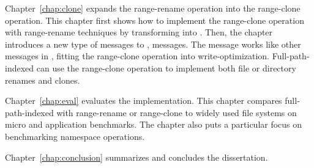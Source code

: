 Chapter~\ref{chap:clone} expands the range-rename operation into the
range-clone operation.
This chapter first shows how to implement the range-clone operation with
range-rename techniques by transforming \bets into \bedags.
Then, the chapter introduces a new type of messages to \bedags, \goto messages.
The \goto message works like other messages in \bedags,
fitting the range-clone operation into write-optimization.
Full-path-indexed \betrfs can use the range-clone operation to implement both
file or directory renames and clones.

Chapter~\ref{chap:eval} evaluates the implementation.
This chapter compares full-path-indexed \betrfs with range-rename or range-clone
to widely used file systems on micro and application benchmarks.
The chapter also puts a particular focus on benchmarking namespace operations.

Chapter~\ref{chap:conclusion} summarizes and concludes the dissertation.

